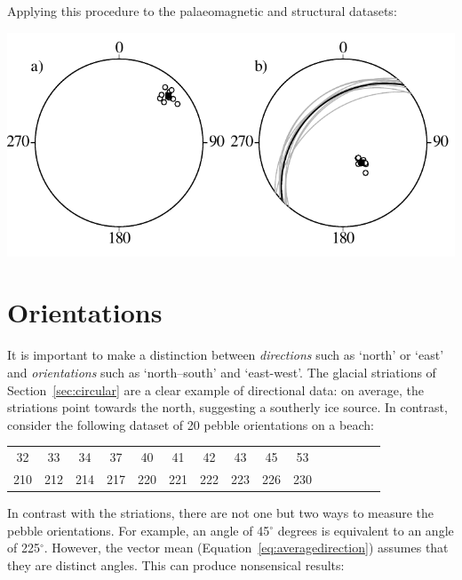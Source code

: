 Applying this procedure to the palaeomagnetic and structural datasets:

\noindent\begin{minipage}[t][][b]{.6\textwidth}
\includegraphics[width=\textwidth]{../figures/sphericalmean.pdf}
\end{minipage}
\begin{minipage}[t][][t]{.4\textwidth}
  \label{fig:sphericalmean}
\end{minipage}

\section{Orientations}\label{sec:orientations}

It is important to make a distinction between \emph{directions} such
as `north' or `east' and \emph{orientations} such as `north--south'
and `east-west'. The glacial striations of Section~\ref{sec:circular}
are a clear example of directional data: on average, the striations
point towards the north, suggesting a southerly ice source.  In
contrast, consider the following dataset of 20 pebble orientations on
a beach:

\begin{center}
\begin{tabular}{ccccccccccccccc}
  32 & 33 & 34 & 37 & 40 & 41 & 42 & 43 & 45 & 53 \\
  210 & 212 & 214 & 217 & 220 & 221 & 222 & 223 & 226 & 230
\end{tabular}
\end{center}

In contrast with the striations, there are not one but two ways to
measure the pebble orientations. For example, an angle of 45$^\circ$
degrees is equivalent to an angle of 225$^\circ$. However, the vector
mean (Equation~\ref{eq:averagedirection}) assumes that they are
distinct angles. This can produce nonsensical results:

